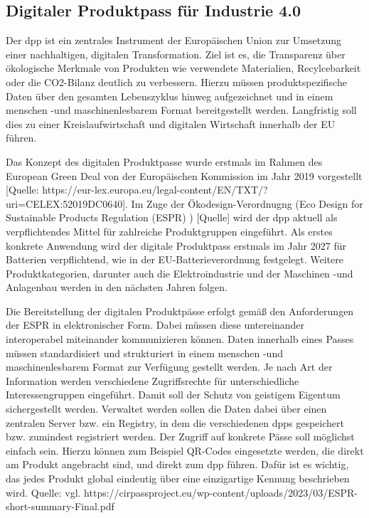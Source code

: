 \subsection{Digitaler Produktpass für Industrie 4.0}
Der \ac{dpp} ist ein zentrales Instrument der Europäischen Union zur Umsetzung einer nachhaltigen, digitalen Transformation.
Ziel ist es, die Transparenz über ökologische Merkmale von Produkten wie verwendete Materialien, Recylcebarkeit oder die CO2-Bilanz deutlich zu verbessern.
Hierzu müssen produktspezifische Daten über den gesamten Lebenszyklus hinweg aufgezeichnet und in einem menschen -und maschinenlesbarem Format bereitgestellt werden.
Langfristig soll dies zu einer Kreislaufwirtschaft und digitalen Wirtschaft innerhalb der EU führen.

Das Konzept des digitalen Produktpasse wurde erstmals im Rahmen des European Green Deal von der Europäischen Kommission im Jahr 2019 vorgestellt [Quelle: https://eur-lex.europa.eu/legal-content/EN/TXT/?uri=CELEX:52019DC0640].
Im Zuge der Ökodesign-Verordnugng (Eco Design for Sustainable Products Regulation (ESPR) ) [Quelle] wird der \acs{dpp} aktuell als verpflichtendes Mittel für zahlreiche Produktgruppen eingeführt.
Als erstes konkrete Anwendung wird der digitale Produktpass erstmals im Jahr 2027 für Batterien verpflichtend, wie in der EU-Batterieverordnung festgelegt.
Weitere Produktkategorien, darunter auch die Elektroindustrie und der Maschinen -und Anlagenbau werden in den nächsten Jahren folgen.

Die Bereitstellung der digitalen Produktpässe erfolgt gemäß den Anforderungen der ESPR in elektronischer Form. Dabei müssen diese untereinander interoperabel miteinander kommunizieren können.
Daten innerhalb eines Passes müssen standardisiert und strukturiert in einem menschen -und maschinenlesbarem Format zur Verfügung gestellt werden.
Je nach Art der Information werden verschiedene Zugriffsrechte für unterschiedliche Interessengruppen eingeführt. Damit soll der Schutz von geistigem Eigentum sichergestellt werden.
Verwaltet werden sollen die Daten dabei über einen zentralen Server bzw. ein Registry, in dem die verschiedenen \acsp{dpp} gespeichert bzw. zumindest registriert werden.
Der Zugriff auf konkrete Pässe soll möglichst einfach sein. Hierzu können zum Beispiel QR-Codes eingesetzte werden, die direkt am Produkt angebracht sind, und direkt zum \acs{dpp} führen.
Dafür ist es wichtig, das jedes Produkt global eindeutig über eine einzigartige Kennung beschrieben wird.
Quelle: vgl. https://cirpassproject.eu/wp-content/uploads/2023/03/ESPR-short-summary-Final.pdf

